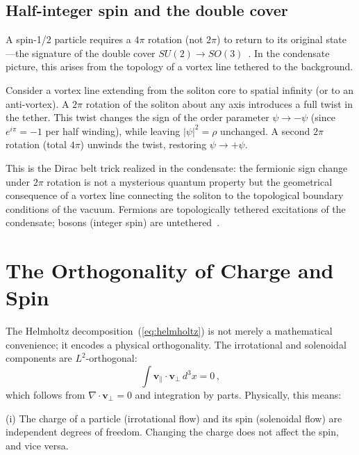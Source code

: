\documentclass[12pt, a4paper]{article}
\begin{document}
\subsection{Half-integer spin and the double cover}

A spin-1/2 particle requires a $4\pi$ rotation (not
$2\pi$) to return to its original state---the
signature of the double cover
$SU(2) \to SO(3)$~\cite{weinberg_1995}. In the
condensate picture, this arises from the topology of
a vortex line tethered to the background.

Consider a vortex line extending from the soliton
core to spatial infinity (or to an anti-vortex). A
$2\pi$ rotation of the soliton about any axis
introduces a full twist in the tether. This twist
changes the sign of the order parameter
$\psi \to -\psi$ (since $e^{i\pi} = -1$ per half
winding), while leaving $|\psi|^2 = \rho$ unchanged.
A second $2\pi$ rotation (total $4\pi$) unwinds the
twist, restoring $\psi \to +\psi$.

This is the Dirac belt trick realized in the
condensate: the fermionic sign change under $2\pi$
rotation is not a mysterious quantum property but the
geometrical consequence of a vortex line connecting
the soliton to the topological boundary conditions of
the vacuum. Fermions are topologically tethered
excitations of the condensate; bosons (integer spin)
are untethered~\cite{volovik_2003}.


\section{The Orthogonality of Charge and Spin}
\label{sec:orthogonality}

The Helmholtz decomposition~(\ref{eq:helmholtz}) is
not merely a mathematical convenience; it encodes
a physical orthogonality. The irrotational and
solenoidal components are $L^2$-orthogonal:
\begin{equation}
    \int \mathbf{v}_\parallel \cdot
    \mathbf{v}_\perp\,d^3x = 0\,,
\label{eq:orthogonal}
\end{equation}
which follows from $\nabla\cdot\mathbf{v}_\perp = 0$
and integration by parts. Physically, this means:

(i) The charge of a particle (irrotational flow) and
its spin (solenoidal flow) are independent degrees of
freedom. Changing the charge does not affect the spin,
and vice versa.
\end{document}
